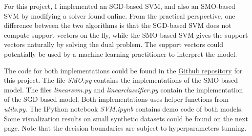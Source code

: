 \documentclass[10pt]{article}
\begin{document}
For this project, I implemented an SGD-based SVM, and also an SMO-based SVM by modifying a solver found online. From the practical perspective, one difference between the two algorithms is that the SGD-based SVM does not compute support vectors on the fly, while the SMO-based SVM gives the support vectors naturally by solving the dual problem. The support vectors could potentially be used by a machine learning practitioner to interpret the model. 

The code for both implementations could be found in the \href{https://github.com/wwJinkla/SVM}{Github repository} for this project. The file \textit{SMO.py} contains the implementations of the SMO-based model. The files \textit{linear\textunderscore svm.py} and \textit{linear\textunderscore classifier.py} contain the implementation of the SGD-based model. Both implementations uses helper functions from \textit{utils.py}. The IPython notebook \textit{SVM.ipynb} contains demo code of both models. Some visualization results on small synthetic datasets could be found on the next page. Note that the decision boundaries are subject to hyperparameters tunning.       
\pagebreak

\newpage
\end{document}
